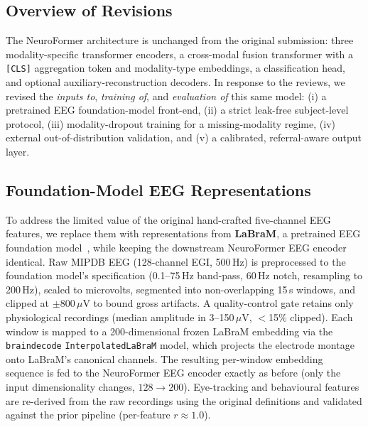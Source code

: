 
\subsection{Overview of Revisions}
The NeuroFormer architecture is unchanged from the original submission: three
modality-specific transformer encoders, a cross-modal fusion transformer with a
\texttt{[CLS]} aggregation token and modality-type embeddings, a classification
head, and optional auxiliary-reconstruction decoders. In response to the reviews,
we revised the \emph{inputs to}, \emph{training of}, and \emph{evaluation of} this
same model: (i) a pretrained EEG foundation-model front-end, (ii) a strict
leak-free subject-level protocol, (iii) modality-dropout training for a
missing-modality regime, (iv) external out-of-distribution validation, and (v) a
calibrated, referral-aware output layer.

\subsection{Foundation-Model EEG Representations}
To address the limited value of the original hand-crafted five-channel EEG
features, we replace them with representations from \textbf{LaBraM}, a pretrained
EEG foundation model~\cite{LaBraM2024}, while keeping the downstream NeuroFormer
EEG encoder identical. Raw MIPDB EEG (128-channel EGI, 500\,Hz) is preprocessed to
the foundation model's specification (0.1--75\,Hz band-pass, 60\,Hz notch,
resampling to 200\,Hz), scaled to microvolts, segmented into non-overlapping
15\,s windows, and clipped at $\pm 800\,\mu$V to bound gross artifacts. A
quality-control gate retains only physiological recordings (median amplitude in
3--150\,$\mu$V, $<$15\% clipped). Each window is mapped to a 200-dimensional frozen
LaBraM embedding via the \texttt{braindecode} \texttt{InterpolatedLaBraM} model,
which projects the electrode montage onto LaBraM's canonical channels. The
resulting per-window embedding sequence is fed to the NeuroFormer EEG encoder
exactly as before (only the input dimensionality changes, $128\!\to\!200$).
Eye-tracking and behavioural features are re-derived from the raw recordings using
the original definitions and validated against the prior pipeline (per-feature
$r\!\approx\!1.0$).

